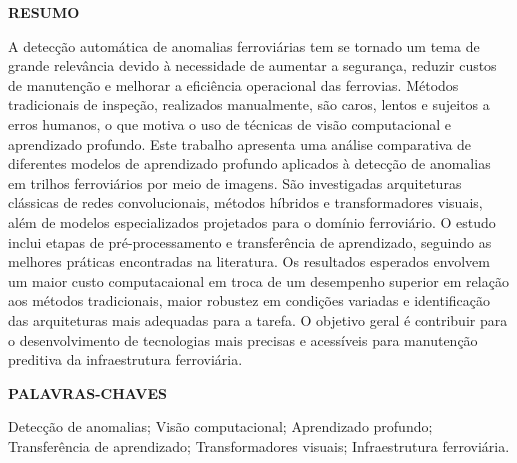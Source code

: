 \newpage
\thispagestyle{empty}
\begin{center}
    \uppercase{\textbf{Resumo}}
\end{center}
A detecção automática de anomalias ferroviárias tem se tornado um tema de grande relevância devido à necessidade de aumentar a segurança, reduzir custos de manutenção e melhorar a eficiência operacional das ferrovias. Métodos tradicionais de inspeção, realizados manualmente, são caros, lentos e sujeitos a erros humanos, o que motiva o uso de técnicas de visão computacional e aprendizado profundo. Este trabalho apresenta uma análise comparativa de diferentes modelos de aprendizado profundo aplicados à detecção de anomalias em trilhos ferroviários por meio de imagens. São investigadas arquiteturas clássicas de redes convolucionais, métodos híbridos e transformadores visuais, além de modelos especializados projetados para o domínio ferroviário. O estudo inclui etapas de pré-processamento e transferência de aprendizado, seguindo as melhores práticas encontradas na literatura. Os resultados esperados envolvem um maior custo computacaional em troca de um desempenho superior em relação aos métodos tradicionais, maior robustez em condições variadas e identificação das arquiteturas mais adequadas para a tarefa. O objetivo geral é contribuir para o desenvolvimento de tecnologias mais precisas e acessíveis para manutenção preditiva da infraestrutura ferroviária.


\begin{center}
    \uppercase{\textbf{Palavras-chaves}}
\end{center}
Detecção de anomalias; Visão computacional; Aprendizado profundo; Transferência de aprendizado; Transformadores visuais; Infraestrutura ferroviária.
